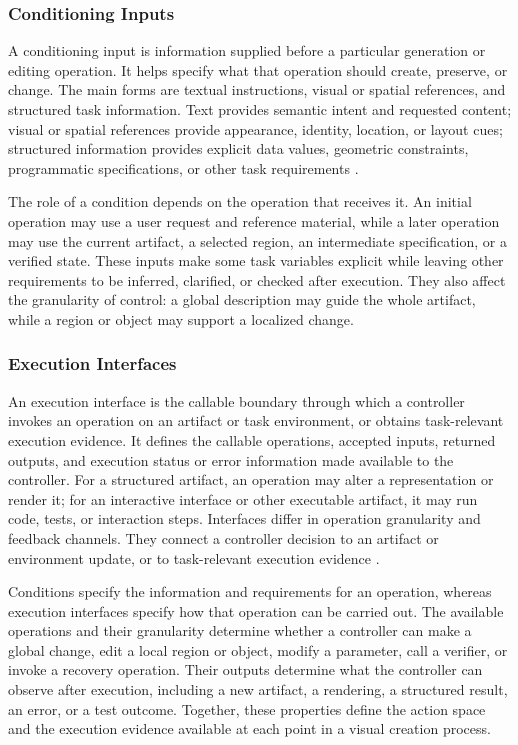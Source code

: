 \subsubsection{Conditioning Inputs}

A conditioning input is information supplied before a particular generation or editing operation. It helps specify what that operation should create, preserve, or change. The main forms are textual instructions, visual or spatial references, and structured task information. Text provides semantic intent and requested content; visual or spatial references provide appearance, identity, location, or layout cues; structured information provides explicit data values, geometric constraints, programmatic specifications, or other task requirements \cite{yang2025textimage,wang2025imageediting,yin2025spatiotemporal}.

The role of a condition depends on the operation that receives it. An initial operation may use a user request and reference material, while a later operation may use the current artifact, a selected region, an intermediate specification, or a verified state. These inputs make some task variables explicit while leaving other requirements to be inferred, clarified, or checked after execution. They also affect the granularity of control: a global description may guide the whole artifact, while a region or object may support a localized change.

\subsubsection{Execution Interfaces}

An execution interface is the callable boundary through which a controller invokes an operation on an artifact or task environment, or obtains task-relevant execution evidence. It defines the callable operations, accepted inputs, returned outputs, and execution status or error information made available to the controller. For a structured artifact, an operation may alter a representation or render it; for an interactive interface or other executable artifact, it may run code, tests, or interaction steps. Interfaces differ in operation granularity and feedback channels. They connect a controller decision to an artifact or environment update, or to task-relevant execution evidence \cite{he2024llms,yin2025spatiotemporal}.

Conditions specify the information and requirements for an operation, whereas execution interfaces specify how that operation can be carried out. The available operations and their granularity determine whether a controller can make a global change, edit a local region or object, modify a parameter, call a verifier, or invoke a recovery operation. Their outputs determine what the controller can observe after execution, including a new artifact, a rendering, a structured result, an error, or a test outcome. Together, these properties define the action space and the execution evidence available at each point in a visual creation process.


